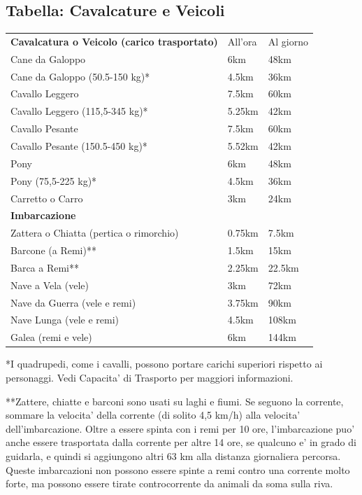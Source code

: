 \documentclass[a4paper,11pt,twoside,openany]{dndbook}
\begin{document}
{\subsection{Tabella: Cavalcature e Veicoli}

\label{tabella-cavalcature-e-veicoli}

\begin{tabular}[c]{@{}lll@{}}
\toprule 
\textbf{Cavalcatura o Veicolo (carico trasportato)} & All'ora & Al giorno\tabularnewline
Cane da Galoppo &6km &48km
\\
Cane da Galoppo (50.5-150 kg)* &4.5km& 36km
\\
Cavallo Leggero& 7.5km &60km
\\
Cavallo Leggero (115,5-345 kg)* &5.25km &42km
\\
Cavallo Pesante &7.5km &60km
\\
Cavallo Pesante (150.5-450 kg)* &5.52km& 42km
\\
Pony &6km &48km
\\
Pony (75,5-225 kg)* &4.5km &36km
\\
Carretto o Carro &3km &24km
\\
\textbf{Imbarcazione} &&\\
Zattera o Chiatta (pertica o rimorchio) & 0.75km &7.5km
\\
Barcone (a Remi)** &1.5km &15km
\\
Barca a Remi** &2.25km& 22.5km
\\
Nave a Vela (vele) &3km &72km
\\
Nave da Guerra (vele e remi) &3.75km& 90km
\\
Nave Lunga (vele e remi) &4.5km& 108km
\\
Galea (remi e vele) &6km& 144km
\\
\bottomrule
\end{tabular}

*I quadrupedi, come i cavalli, possono portare carichi superiori rispetto ai personaggi. Vedi Capacita' di Trasporto per maggiori informazioni.

**Zattere, chiatte e barconi sono usati su laghi e fiumi. Se seguono la corrente, sommare la velocita' della corrente (di solito 4,5 km/h) alla velocita' dell'imbarcazione. Oltre a essere spinta con i remi per 10 ore, l'imbarcazione puo' anche essere trasportata dalla corrente per altre 14 ore, se qualcuno e' in grado di guidarla, e quindi si aggiungono altri 63 km alla distanza giornaliera percorsa. Queste imbarcazioni non possono essere spinte a remi contro una corrente molto forte, ma possono essere tirate controcorrente da animali da soma sulla riva.

}
\end{document}
